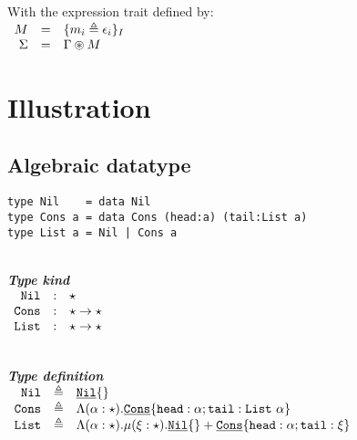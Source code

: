\documentclass{article}[11pt]
\newcommand{\subsubsubsection}[1]
{
    ~\\
    {\bf {\em #1}} \\
}
\newcommand{\term}[1]{\verb~#1~}
\newcommand{\cons}[1]{\underline{\verb~#1~}}
\begin{document}
    With the expression trait defined by: \\

    \begin{math}
        \begin{array}{rclp{5cm}}
            M      & = & \{ m_i \triangleq \epsilon_i \}_I \\
            \Sigma & = & \Gamma \circledast M              \\
        \end{array}
    \end{math}


    \section{Illustration}\label{sec:illustration}

    \subsection{Algebraic datatype}\label{subsec:algebraic-datatype}

    \begin{verbatim}
type Nil    = data Nil
type Cons a = data Cons (head:a) (tail:List a)
type List a = Nil | Cons a
    \end{verbatim}

    \subsubsubsection{Type kind}

    \noindent
    \begin{math}
        \begin{array}{rclp{5cm}}
            \term{Nil}  & : & \star                   \\
            \term{Cons} & : & \star \rightarrow \star \\
            \term{List} & : & \star \rightarrow \star
        \end{array}
    \end{math}

    \subsubsubsection{Type definition}

    \noindent
    \begin{math}
        \begin{array}{rclp{5cm}}
            \term{Nil}  & \triangleq & \cons{Nil}\{\}                                                                                                \\
            \term{Cons} & \triangleq & \Lambda(\alpha:\star).\cons{Cons}\{ \term{head} :\alpha; \term{tail} : \term{List} ~ \alpha \}                \\
            \term{List} & \triangleq & \Lambda(\alpha:\star).\mu(\xi:\star).\cons{Nil}\{\} + \cons{Cons}\{ \term{head} :\alpha; \term{tail} : \xi \}
        \end{array}
    \end{math}
\end{document}
